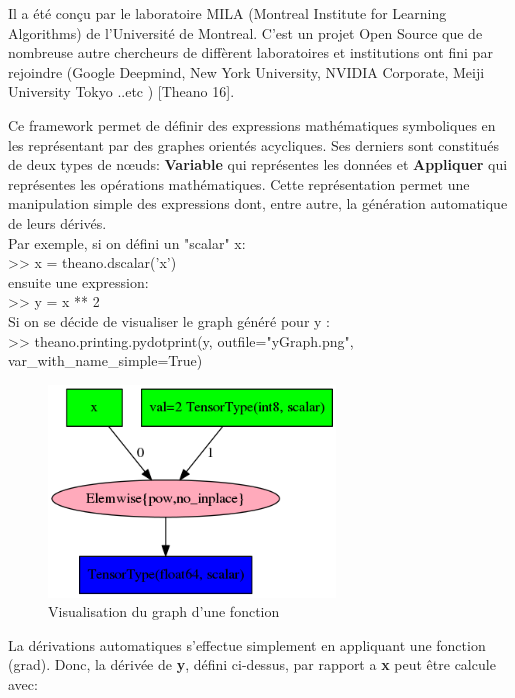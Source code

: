 Il a été conçu par le laboratoire MILA (Montreal Institute for Learning Algorithms) de l’Université de Montreal. C'est un projet Open Source que de nombreuse autre chercheurs de diffèrent laboratoires et institutions ont fini par rejoindre (Google Deepmind, New  York  University, NVIDIA Corporate, Meiji  University Tokyo ..etc ) [Theano 16].

Ce framework permet de définir des expressions mathématiques symboliques en les représentant par des graphes orientés acycliques. Ses derniers sont constitués de deux types de nœuds: \textbf{Variable} qui représentes les données et \textbf{Appliquer} qui représentes les opérations mathématiques. Cette représentation permet une manipulation simple des expressions dont, entre autre, la génération automatique de leurs dérivés.\\

Par exemple, si on défini un "scalar" x: \\

>> x = theano.dscalar('x')\\

ensuite une expression: \\

>> y = x ** 2\\

Si on se décide de visualiser le graph généré pour y :\\

>> theano.printing.pydotprint(y, outfile="yGraph.png", var\_with\_name\_simple=True)\\

\begin{figure}[H]
	\centering
		\includegraphics[width=3in]{Figures/yGraph.png}
	\caption[TheanoGraph]{Visualisation du graph d'une fonction}
	\label{fig:Electron}
\end{figure}

La dérivations automatiques s'effectue simplement en appliquant une fonction (grad). 
Donc, la dérivée de \textbf{y}, défini ci-dessus, par rapport a \textbf{x} peut être calcule avec: \\

